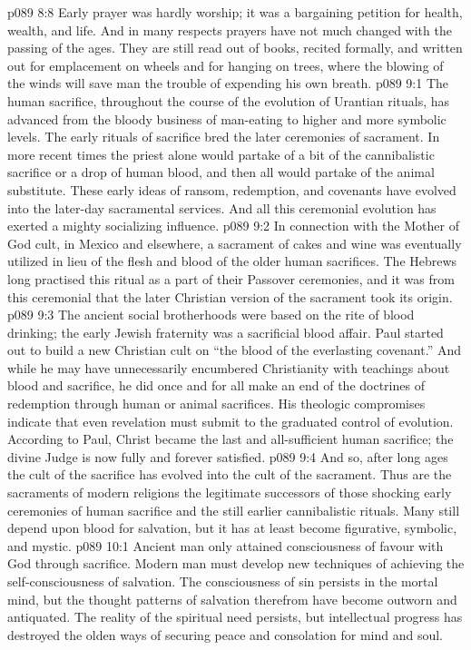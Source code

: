 \vs p089 8:8 Early prayer was hardly worship; it was a bargaining petition for health, wealth, and life. And in many respects prayers have not much changed with the passing of the ages. They are still read out of books, recited formally, and written out for emplacement on wheels and for hanging on trees, where the blowing of the winds will save man the trouble of expending his own breath.
\vs p089 9:1 The human sacrifice, throughout the course of the evolution of Urantian rituals, has advanced from the bloody business of man\hyp{}eating to higher and more symbolic levels. The early rituals of sacrifice bred the later ceremonies of sacrament. In more recent times the priest alone would partake of a bit of the cannibalistic sacrifice or a drop of human blood, and then all would partake of the animal substitute. These early ideas of ransom, redemption, and covenants have evolved into the later\hyp{}day sacramental services. And all this ceremonial evolution has exerted a mighty socializing influence.
\vs p089 9:2 In connection with the Mother of God cult, in Mexico and elsewhere, a sacrament of cakes and wine was eventually utilized in lieu of the flesh and blood of the older human sacrifices. The Hebrews long practised this ritual as a part of their Passover ceremonies, and it was from this ceremonial that the later Christian version of the sacrament took its origin.
\vs p089 9:3 The ancient social brotherhoods were based on the rite of blood drinking; the early Jewish fraternity was a sacrificial blood affair. Paul started out to build a new Christian cult on “the blood of the everlasting covenant.” And while he may have unnecessarily encumbered Christianity with teachings about blood and sacrifice, he did once and for all make an end of the doctrines of redemption through human or animal sacrifices. His theologic compromises indicate that even revelation must submit to the graduated control of evolution. According to Paul, Christ became the last and all\hyp{}sufficient human sacrifice; the divine Judge is now fully and forever satisfied.
\vs p089 9:4 And so, after long ages the cult of the sacrifice has evolved into the cult of the sacrament. Thus are the sacraments of modern religions the legitimate successors of those shocking early ceremonies of human sacrifice and the still earlier cannibalistic rituals. Many still depend upon blood for salvation, but it has at least become figurative, symbolic, and mystic.
\vs p089 10:1 Ancient man only attained consciousness of favour with God through sacrifice. Modern man must develop new techniques of achieving the self\hyp{}consciousness of salvation. The consciousness of sin persists in the mortal mind, but the thought patterns of salvation therefrom have become outworn and antiquated. The reality of the spiritual need persists, but intellectual progress has destroyed the olden ways of securing peace and consolation for mind and soul.
